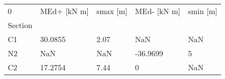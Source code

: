 \begin{tabular}{lllll}
\toprule
0 & MEd+ [kN m] & smax [m] & MEd- [kN m] & smin [m] \\
Section &             &          &             &          \\
\midrule
C1      &     30.0855 &     2.07 &         NaN &      NaN \\
N2      &         NaN &      NaN &    -36.9699 &        5 \\
C2      &     17.2754 &     7.44 &           0 &      NaN \\
\bottomrule
\end{tabular}
